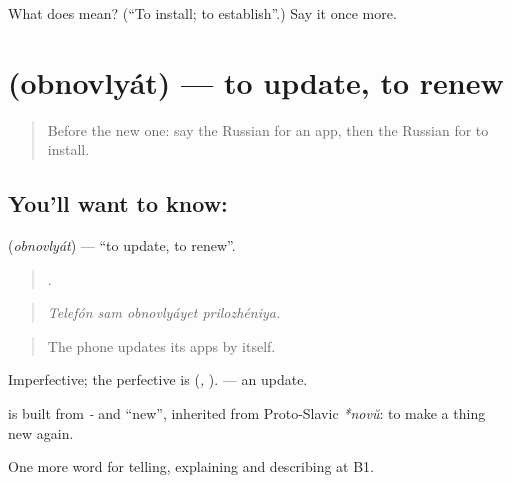 \begin{tcolorbox}[breakable,colback=teal!4,colframe=teal!35!black,title={Before you move on}]
What does  mean? (\textquotedblleft{}To install; to establish\textquotedblright{}.) Say it once more.
\end{tcolorbox}
\section[\texorpdfstring{\ru{обновлять} (obnovlyát)}{обновлять (obnovlyát)}]{ (obnovlyát) — to update, to renew}

\label{lesson:RU-C401-obnovlyat}



\begin{quote}
Before the new one: say the Russian for an app, then the Russian for to install.
\end{quote}

\subsection*{You'll want to know: }
\textbf{} (\emph{obnovlyát}) — \textquotedblleft{}to update, to renew\textquotedblright{}.

\begin{quote}
   .
\end{quote}

\begin{quote}
\emph{Telefón sam obnovlyáyet prilozhéniya.}
\end{quote}

\begin{quote}
The phone updates its apps by itself.
\end{quote}

Imperfective; the perfective is \emph{} (\emph{, }). \emph{} — an update.

\begin{cousinweb}
\textbf{} is built from \emph{-} and \emph{} \textquotedblleft{}new\textquotedblright{}, inherited from Proto-Slavic \emph{*novŭ}: to make a thing new again.
\end{cousinweb}

\begin{grammarlens}[title={What you've built}]
One more word for telling, explaining and describing at B1.
\end{grammarlens}

